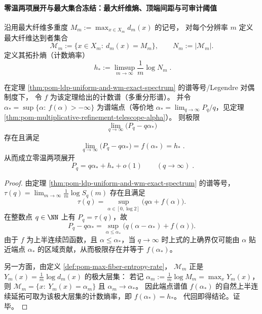 \paragraph{零温两项展开与最大集合冻结：最大纤维熵、顶端间距与可审计阈值}

\begin{definition}[最大纤维达到者的熵率]\label{def:pom-max-fiber-entropy-rate}
沿用最大纤维多重度 \(M_m:=\max_{x\in X_m}d_m(x)\) 的记号，
对每个分辨率 \(m\) 定义最大纤维达到者集合
\[
\mathcal{M}_m:=\{x\in X_m:\ d_m(x)=M_m\},
\qquad
N_m:=|\mathcal{M}_m|.
\]
定义其拓扑熵（计数熵率）
\[
\boxed{\;
h_\ast:=\limsup_{m\to\infty}\frac{1}{m}\log N_m\; }.
\]
\end{definition}

\begin{theorem}\label{thm:pom-zero-temperature-two-term-expansion-maxfiber-entropy}
在定理 \ref{thm:pom-ldp-uniform-and-wm-exact-spectrum} 的谱等号/Legendre 对偶制度下，
令 \(f\) 为该定理给出的计数谱（多重分形谱）。
并令
\(
\alpha_\ast=\sup\{\alpha:\ f(\alpha)>-\infty\}
\)
为谱端点（等价地 \(\alpha_\ast=\lim_{q\to\infty}P_q/q\)，见定理 \ref{thm:pom-multiplicative-refinement-telescope-alpha}）。
则极限
\[
\lim_{q\to\infty}\bigl(P_q-q\alpha_\ast\bigr)
\]
存在且满足
\[
\boxed{\;
\lim_{q\to\infty}\bigl(P_q-q\alpha_\ast\bigr)
=
f(\alpha_\ast)
=
h_\ast\; }.
\]
从而成立零温两项展开
\[
\boxed{\;
P_q=q\alpha_\ast+h_\ast+o(1)\qquad(q\to\infty)\; }.
\]
\end{theorem}
\begin{proof}
由定理 \ref{thm:pom-ldp-uniform-and-wm-exact-spectrum} 的谱等号，
\(\tau(q)=\lim_{m\to\infty}\frac{1}{m}\log S_q(m)\) 存在且满足
\[
\tau(q)=\sup_{\alpha\in[0,\log 2]}\bigl(q\alpha+f(\alpha)\bigr).
\]
在整数点 \(q\in\NN\) 上有 \(P_q=\tau(q)\)，故
\[
P_q-q\alpha_\ast
=
\sup_{\alpha\le \alpha_\ast}\bigl(q(\alpha-\alpha_\ast)+f(\alpha)\bigr).
\]
由于 \(f\) 为上半连续凹函数，且 \(\alpha\le \alpha_\ast\)，当 \(q\to\infty\) 时上式的上确界仅可能由 \(\alpha\) 贴近端点 \(\alpha_\ast\) 的区域贡献，从而极限存在并等于 \(f(\alpha_\ast)\)。
\par
另一方面，由定义 \ref{def:pom-max-fiber-entropy-rate}，
\(\mathcal{M}_m\) 正是 \(Y_m(x)=\frac1m\log d_m(x)\) 的极大层集：
若记 \(\alpha_m:=\frac1m\log M_m=\max_x Y_m(x)\)，则
\(
\mathcal{M}_m=\{x:\ Y_m(x)=\alpha_m\}
\)
且 \(\alpha_m\to\alpha_\ast\)。
因此端点谱值 \(f(\alpha_\ast)\) 的自然上半连续延拓可取为该极大层集的计数熵率，即 \(f(\alpha_\ast)=h_\ast\)。
代回即得结论。证毕。
\end{proof}

